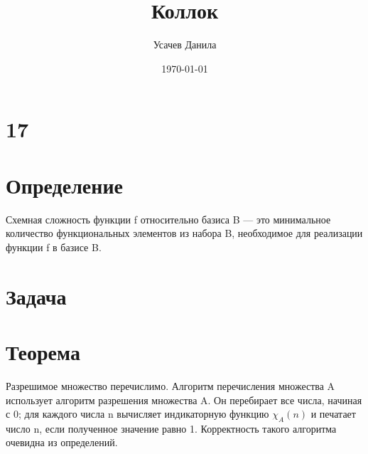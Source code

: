 \documentclass[12pt,a4paper]{scrartcl}
\title{Коллок}
\author{Усачев Данила}
\date{\today}
\begin{document}
\maketitle
\noindent
\section*{17}
\section*{Определение}
Схемная сложность функции f относительно базиса B —
это минимальное количество функциональных элементов из набора B, необходимое
для реализации функции f в базисе B.
\section*{Задача}
\section*{Теорема}
Разрешимое множество перечислимо.
Алгоритм перечисления множества A использует алгоритм разрешения множества A.
Он перебирает все числа, начиная с 0; для каждого числа n вычисляет индикаторную
функцию $\chi_A(n)$ и печатает число n, если полученное значение равно 1.
Корректность такого алгоритма очевидна из определений.
\end{document}

